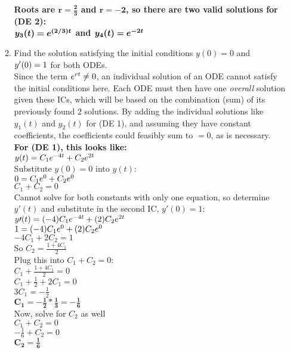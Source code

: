 \documentclass{article}
\begin{document}
\begin{enumerate}
\begin{enumerate}
\textbf{Roots are $\bm{r=\frac{2}{3}}$ and $\bm{r=-2}$, so there are two valid solutions for (DE 2):}\\
\textbf{$\bm{y_{3}(t) = e\sp{(2/3)t}}$ and $\bm{y_{4}(t) = e\sp{-2t}}$}\\

\item Find the solution satisfying the initial conditions $y(0)=0$ and $y\sp\prime(0)=1$ for both ODEs.\\

Since the term $e\sp{rt}\neq0$, an individual solution of an ODE cannot satisfy the initial conditions here. Each ODE must then have one \textit{overall} solution given these ICs, which will be based on the combination (sum) of its previously found 2 solutions. By adding the individual solutions like $y_1(t)$ and $y_2(t)$ for (DE 1), and assuming they have constant coefficients, the coefficients could feasibly sum to $=0$, as is necessary.\\

\textbf{For (DE 1), this looks like:}\\
$y(t) = C_{1}e\sp{-4t} + C_{2}e\sp{2t}$\\
Substitute $y(0)=0$ into $y(t)$:\\
$0 = C_{1}e\sp{0} + C_{2}e\sp{0}$\\
$C_{1} + C_{2}=0$\\
Cannot solve for both constants with only one equation, so determine $y\prime(t)$ and substitute in the second IC, $y\prime(0)=1$:\\
$y\prime(t) = (-4)C_{1}e\sp{-4t} + (2)C_{2}e\sp{2t}$\\
$1 = (-4)C_{1}e\sp{0} + (2)C_{2}e\sp{0}$\\
$-4C_{1} + 2C_{2} = 1$\\

So $C_{2}=\frac{1+4C_{1}}{2}$\\
Plug this into $C_{1} + C_{2}=0$:\\
$C_{1} + \frac{1+4C_{1}}{2}=0$\\
$C_{1} + \frac{1}{2}+2C_{1}=0$\\
$3C_{1}=-\frac{1}{2}$\\
$\bm{C_{1}=-\frac{1}{2}*\frac{1}{3} = -\frac{1}{6}}$\\
Now, solve for $C_{2}$ as well\\
$C_{1} + C_{2}=0$\\
$-\frac{1}{6} + C_{2}=0$\\
$\bm{C_{2}=\frac{1}{6}}$\\


\end{enumerate}
\end{enumerate}
\end{document}
